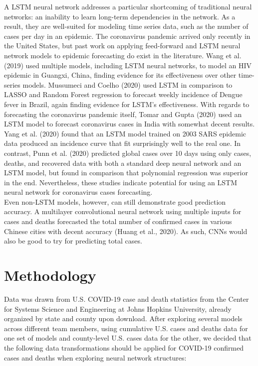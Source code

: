 ﻿\documentclass{article}
\begin{document}
\begin{multicols}{2}
A LSTM neural network addresses a particular shortcoming of traditional neural
networks: an inability to learn long-term dependencies in the network. As a
result, they are well-suited for modeling time series data, such as the number
of cases per day in an epidemic. The coronavirus pandemic arrived only recently
in the United States, but past work on applying feed-forward and LSTM neural
network models to epidemic forecasting do exist in the literature. Wang et al.
(2019) used multiple models, including LSTM neural networks, to model an HIV
epidemic in Guangxi, China, finding evidence for its effectiveness over other
time-series models. Mussumeci and Coelho (2020) used LSTM in comparison to LASSO
and Random Forest regression to forecast weekly incidence of Dengue fever in
Brazil, again finding evidence for LSTM’s effectiveness. With regards to
forecasting the coronavirus pandemic itself, Tomar and Gupta (2020) used an LSTM
model to forecast coronavirus cases in India with somewhat decent results. Yang
et al. (2020) found that an LSTM model trained on 2003 SARS epidemic data
produced an incidence curve that fit surprisingly well to the real one. In
contrast, Punn et al. (2020) predicted global cases over 10 days using only
cases, deaths, and recovered data with both a standard deep neural network and
an LSTM model, but found in comparison that polynomial regression was superior
in the end. Nevertheless, these studies indicate potential for using an LSTM
neural network for coronavirus cases forecasting.\\
Even non-LSTM models, however, can still demonstrate good prediction accuracy. A
multilayer convolutional neural network using multiple inputs for cases and
deaths forecasted the total number of confirmed cases in various Chinese cities
with decent accuracy (Huang et al., 2020). As such, CNNs would also be good to
try for predicting total cases.

\section*{Methodology}

Data was drawn from  U.S. COVID-19 case and death statistics from the Center for
Systems Science and Engineering at Johns Hopkins University, already organized
by state and county upon download. After exploring several models across
different team members, using cumulative U.S. cases and deaths data for one
set of models and county-level U.S. cases data for the other, we decided that
the following data transformations should be applied for COVID-19 confirmed
cases and deaths when exploring neural network structures:


\end{multicols}
\end{document}
